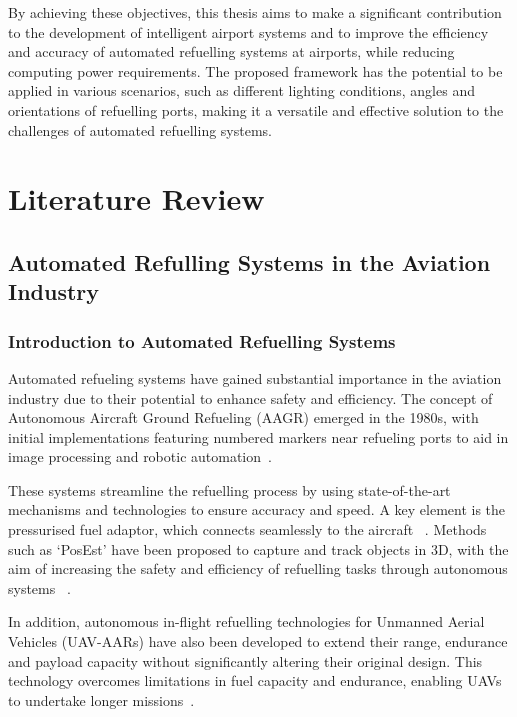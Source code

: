 \documentclass[12pt,oneside]{book} %
\begin{document}
By achieving these objectives, this thesis aims to make a significant
contribution to the development of intelligent airport systems and to improve
the efficiency and accuracy of automated refuelling systems at airports, while
reducing computing power requirements. The proposed framework has the potential
to be applied in various scenarios, such as different lighting conditions,
angles and orientations of refuelling ports, making it a versatile and
effective solution to the challenges of automated refuelling systems.

\chapter{Literature Review}
\section{Automated Refulling Systems in the Aviation Industry}
\subsection{Introduction to Automated Refuelling Systems}
Automated refueling systems have gained substantial importance in the aviation
industry due to their potential to enhance safety and efficiency. The concept
of Autonomous Aircraft Ground Refueling (AAGR) emerged in the 1980s, with
initial implementations featuring numbered markers near refueling ports to aid
in image processing and robotic automation~\cite{Schultz1986, Bennett1991,
    DatasetAGR}.

These systems streamline the refuelling process by using state-of-the-art
mechanisms and technologies to ensure accuracy and speed. A key element is the
pressurised fuel adaptor, which connects seamlessly to the aircraft
~\cite{HybridDatasetAGRV2}. Methods such as `PosEst' have been proposed to
capture and track objects in 3D, with the aim of increasing the safety and
efficiency of refuelling tasks through autonomous systems
~\cite{AGRPoseEstimation}.

In addition, autonomous in-flight refuelling technologies for Unmanned Aerial
Vehicles (UAV-AARs) have also been developed to extend their range, endurance
and payload capacity without significantly altering their original design. This
technology overcomes limitations in fuel capacity and endurance, enabling UAVs
to undertake longer missions~\cite{AARBinocularVision}.
\end{document}
